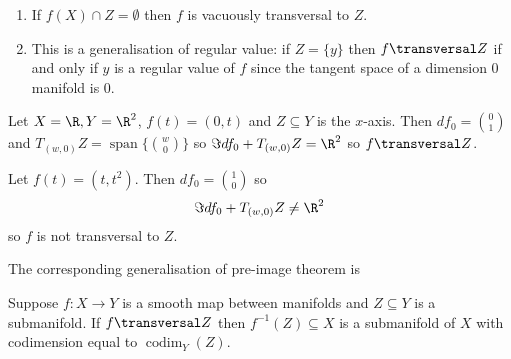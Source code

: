 \documentclass[a4paper]{article}
\DeclareMathOperator{\codim}{codim}
\begin{document}
\begin{remark}\leavevmode
  \begin{enumerate}
  \item If \(f(X) \cap Z = \emptyset\) then \(f\) is vacuously transversal to \(Z\).
  \item This is a generalisation of regular value: if \(Z = \{y\}\) then \(f \transversal Z\) if and only if \(y\) is a regular value of \(f\) since the tangent space of a dimension \(0\) manifold is \(0\).
  \end{enumerate}
\end{remark}

\begin{eg}
  Let \(X = \R, Y = \R^2\), \(f(t) = (0, t)\) and \(Z \subseteq Y\) is the \(x\)-axis. Then \(df_0 = \binom{0}{1}\) and \(T_{(w, 0)}Z = \operatorname{span}\{\binom{w}{0}\}\) so \(\Im df_0 + T_{(w, 0)}Z = \R^2\) so \(f \transversal Z\).
\end{eg}

\begin{eg}
  Let \(f(t) = (t, t^2)\). Then \(df_0 = \binom{1}{0}\) so
  \[
    \Im df_0 + T_{(w, 0)}Z \neq \R^2
  \]
  so \(f\) is not transversal to \(Z\).
\end{eg}

The corresponding generalisation of pre-image theorem is

\begin{theorem}
  Suppose \(f: X \to Y\) is a smooth map between manifolds and \(Z \subseteq Y\) is a submanifold. If \(f \transversal Z\) then \(f^{-1}(Z) \subseteq X\) is a submanifold of \(X\) with codimension equal to \(\codim_Y(Z)\).
\end{theorem}
\end{document}
